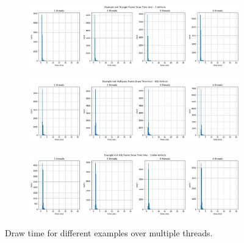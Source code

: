 \documentclass[12pt]{report}
\theoremstyle{definition}
\begin{document}
    \afterpage
    {
      \begin{figure}
        \begin{subfigure}[b]{\textwidth}
          \includegraphics[width=\textwidth]{images/triangle_draw.png}
        \end{subfigure}
        \begin{subfigure}[b]{\textwidth}
          \includegraphics[width=\textwidth]{images/multipass_draw.png}
        \end{subfigure}
        \begin{subfigure}[b]{\textwidth}
          \includegraphics[width=\textwidth]{images/obj_draw.png}
        \end{subfigure}
        \caption{Draw time for different examples over multiple threads.}
        \label{fig:draw}                        
      \end{figure}

      \clearpage

}
\end{document}
